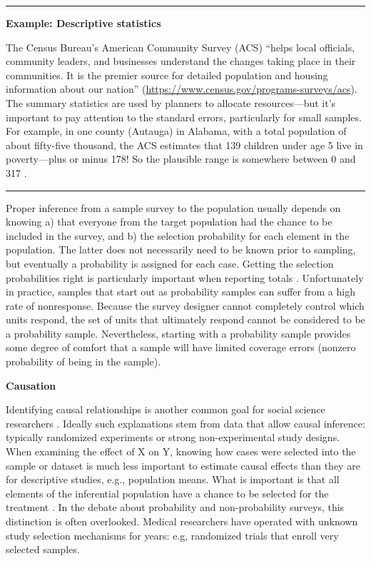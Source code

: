 \documentclass[]{krantz}
\begin{document}
\begin{center}\rule{0.5\linewidth}{\linethickness}\end{center}

\textbf{Example: Descriptive statistics}

The Census Bureau's American Community Survey (ACS) ``helps local
officials, community leaders, and businesses understand the changes
taking place in their communities. It is the premier source for detailed
population and housing information about our nation''
(\url{https://www.census.gov/programs-surveys/acs}). The summary
statistics are used by planners to allocate resources---but it's
important to pay attention to the standard errors, particularly for
small samples. For example, in one county (Autauga) in Alabama, with a
total population of about fifty-five thousand, the ACS estimates that
139 children under age 5 live in poverty---plus or minus 178! So the
plausible range is somewhere between 0 and 317 \citep{Spielman2015}.

\begin{center}\rule{0.5\linewidth}{\linethickness}\end{center}

Proper inference from a sample survey to the population usually depends
on knowing a) that everyone from the target population had the chance to
be included in the survey, and b) the selection probability for each
element in the population. The latter does not necessarily need to be
known prior to sampling, but eventually a probability is assigned for
each case. Getting the selection probabilities right is particularly
important when reporting totals \citep{lohr2009sampling}. Unfortunately
in practice, samples that start out as probability samples can suffer
from a high rate of nonresponse. Because the survey designer cannot
completely control which units respond, the set of units that ultimately
respond cannot be considered to be a probability sample. Nevertheless,
starting with a probability sample provides some degree of comfort that
a sample will have limited coverage errors (nonzero probability of being
in the sample).

\textbf{Causation}

Identifying causal relationships is another common goal for social
science researchers \citep{varian2014big}. Ideally such explanations
stem from data that allow causal inference: typically randomized
experiments or strong non-experimental study designs. When examining the
effect of X on Y, knowing how cases were selected into the sample or
dataset is much less important to estimate causal effects than they are
for descriptive studies, e.g., population means. What is important is
that all elements of the inferential population have a chance to be
selected for the treatment \citep{imbens2015causal}. In the debate about
probability and non-probability surveys, this distinction is often
overlooked. Medical researchers have operated with unknown study
selection mechanisms for years: e.g, randomized trials that enroll very
selected samples.
\end{document}
